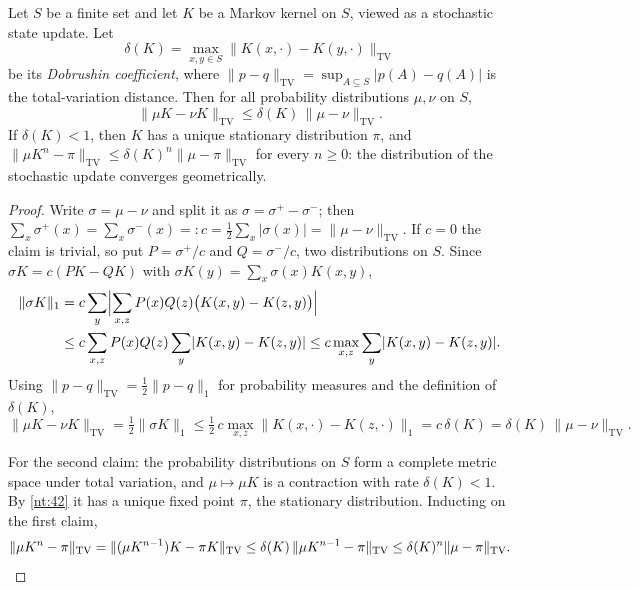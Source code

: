 \begin{theorem}\label{nt:45}
Let $S$ be a finite set and let $K$ be a Markov kernel on $S$, viewed as a stochastic state update. Let
\[ \delta(K) = \max_{x,y \in S} \lVert K(x,\cdot) - K(y,\cdot) \rVert_{\mathrm{TV}} \]
be its \emph{Dobrushin coefficient}, where $\lVert p - q \rVert_{\mathrm{TV}} = \sup_{A \subseteq S} \lvert p(A) - q(A) \rvert$ is the total-variation distance. Then for all probability distributions $\mu,\nu$ on $S$,
\[ \lVert \mu K - \nu K \rVert_{\mathrm{TV}} \leq \delta(K)\,\lVert \mu - \nu \rVert_{\mathrm{TV}} . \]
If $\delta(K) < 1$, then $K$ has a unique stationary distribution $\pi$, and $\lVert \mu K^n - \pi \rVert_{\mathrm{TV}} \leq \delta(K)^n \lVert \mu - \pi \rVert_{\mathrm{TV}}$ for every $n \geq 0$: the distribution of the stochastic update converges geometrically.
\end{theorem}

\begin{proof}
Write $\sigma = \mu - \nu$ and split it as $\sigma = \sigma^+ - \sigma^-$; then $\sum_x \sigma^+(x) = \sum_x \sigma^-(x) =: c = \tfrac12 \sum_x \lvert \sigma(x) \rvert = \lVert \mu - \nu \rVert_{\mathrm{TV}}$. If $c = 0$ the claim is trivial, so put $P = \sigma^+/c$ and $Q = \sigma^-/c$, two distributions on $S$. Since $\sigma K = c(PK - QK)$ with $\sigma K(y) = \sum_x \sigma(x) K(x,y)$,
\begin{align*}
\lVert \sigma K \rVert_1 &= c \sum_y \Bigl\lvert \sum_{x,z} P(x)Q(z)\bigl(K(x,y) - K(z,y)\bigr) \Bigr\rvert \\
&\leq c \sum_{x,z} P(x)Q(z) \sum_y \lvert K(x,y) - K(z,y) \rvert \leq c \max_{x,z} \sum_y \lvert K(x,y) - K(z,y) \rvert .
\end{align*}
Using $\lVert p - q \rVert_{\mathrm{TV}} = \tfrac12 \lVert p - q \rVert_1$ for probability measures and the definition of $\delta(K)$,
\[ \lVert \mu K - \nu K \rVert_{\mathrm{TV}} = \tfrac12 \lVert \sigma K \rVert_1 \leq \tfrac12\, c \max_{x,z} \lVert K(x,\cdot) - K(z,\cdot) \rVert_1 = c\,\delta(K) = \delta(K)\,\lVert \mu - \nu \rVert_{\mathrm{TV}}. \]

For the second claim: the probability distributions on $S$ form a complete metric space under total variation, and $\mu \mapsto \mu K$ is a contraction with rate $\delta(K) < 1$. By \autoref{nt:42} it has a unique fixed point $\pi$, the stationary distribution. Inducting on the first claim,
\[ \lVert \mu K^n - \pi \rVert_{\mathrm{TV}} = \lVert (\mu K^{n-1})K - \pi K \rVert_{\mathrm{TV}} \leq \delta(K)\,\lVert \mu K^{n-1} - \pi \rVert_{\mathrm{TV}} \leq \delta(K)^n \lVert \mu - \pi \rVert_{\mathrm{TV}}. \qedhere \]
\end{proof}

